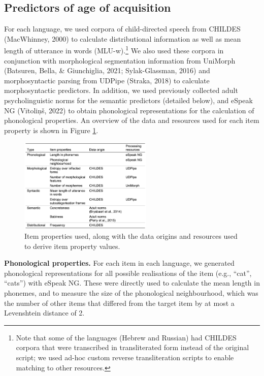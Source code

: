 \documentclass[10pt, letterpaper]{article}
\newenvironment{CodeChunk}{}{}
\begin{document}
\hypertarget{predictors-of-age-of-acquisition}{%
\subsection{Predictors of age of
acquisition}\label{predictors-of-age-of-acquisition}}

For each language, we used corpora of child-directed speech from CHILDES
(MacWhinney, 2000) to calculate distributional information as well as
mean length of utterance in words (MLU-w).\footnote{Note that some of
  the languages (Hebrew and Russian) had CHILDES corpora that were
  transcribed in transliterated form instead of the original script; we
  used ad-hoc custom reverse transliteration scripts to enable matching
  to other resources.} We also used these corpora in conjunction with
morphological segmentation information from UniMorph (Batsuren, Bella,
\& Giunchiglia, 2021; Sylak-Glassman, 2016) and morphosyntactic parsing
from UDPipe (Straka, 2018) to calculate morphosyntactic predictors. In
addition, we used previously collected adult psycholinguistic norms for
the semantic predictors (detailed below), and eSpeak NG (Vītoliņš, 2022)
to obtain phonological representations for the calculation of
phonological properties. An overview of the data and resources used for
each item property is shown in Figure \ref{fig:sources}.

\begin{CodeChunk}
\begin{figure}[ht]

{\centering \includegraphics[width=240px]{figs/sources} 

}

\caption[Item properties used, along with the data origins and resources used to derive item property values]{Item properties used, along with the data origins and resources used to derive item property values.}\label{fig:sources}
\end{figure}
\end{CodeChunk}

\textbf{Phonological properties.} For each item in each language, we
generated phonological representations for all possible realisations of
the item (e.g., ``cat'', ``cats'') with eSpeak NG. These were directly
used to calculate the mean length in phonemes, and to measure the size
of the phonological neighbourhood, which was the number of other items
that differed from the target item by at most a Levenshtein distance of
2.
\end{document}
